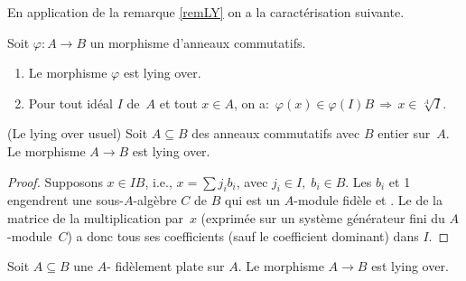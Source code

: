 En application de la remarque \ref{remLY} on a la caractérisation suivante.


\begin{lemma} 
\label{lemGU1} Soit $\varphi:A\to B$ un morphisme d'anneaux commutatifs. 
\Propeq
%
\begin{enumerate}
%
\item Le morphisme $\varphi$ est lying over.
%
\item Pour tout idéal  $I$ de~$A$  et tout $x\in A$, on a:
$\, \varphi(x)\in \varphi(I)B\, \Rightarrow \, x\in\sqrt[A]{I}.
$  
%
\end{enumerate}

\end{lemma}

\begin{lemma} 
\label{corLyO} 
{\rm (Le lying over usuel)} Soit $A\subseteq B$ des anneaux commutatifs avec $B$ 
entier sur~$A$. Le morphisme $A\to B$ est lying over.
\end{lemma}
\begin{proof}
Supposons  $ x\in {IB}$, i.e., $x=\sum j_ib_i$, avec
$j_i\in I,\;b_i\in B$. Les $b_i$ et 1 engendrent une sous-$A$-algèbre $C$ de $B$ qui est un $A$-module 
fidèle et \tf.   Le \polcar de la matrice de la multiplication 
par~$x$ (exprimée sur un système générateur fini du $A$-module~$C$) a donc tous ses 
coefficients (sauf le coefficient dominant) dans $I$.     
\end{proof}


\begin{lemma} \label{lemGuAnFp}
Soit $A\subseteq B$ une $A$-\alg 
fidèlement plate sur $A$. Le morphisme $A\to B$ est lying over. 
\end{lemma}


\label{subsecGU}

